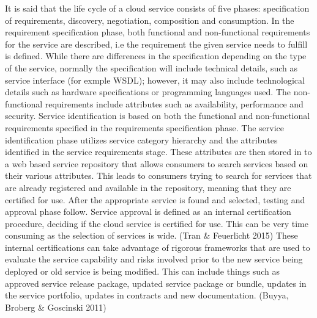\documentclass{article}
\begin{document}
It is said that the life cycle of a cloud service consists of five phases: specification of requirements, discovery, negotiation, composition and consumption. In the requirement specification phase, both functional and non-functional requirements for the service are described, i.e the requirement the given service needs to fulfill is defined. While there are differences in the specification depending on the type of the service, normally the specification will include technical details, such as service interface (for exmple WSDL); however, it may also include technological details such as hardware specifications or programming languages used. The non-functional requirements include attributes such as availability, performance and security. Service identification is based on both the functional and non-functional requirements specified in the requirements specification phase. The service identification phase utilizes service category hierarchy and the attributes identified in the service requirements stage. These attributes are then stored in to a web based service repository that allows consumers to search services based on their various attributes. This leads to consumers trying to search for services that are already registered and available in the repository, meaning that they are certified for use. After the appropriate service is found and selected, testing and approval phase follow. Service approval is defined as an internal certification procedure, deciding if the cloud service is certified for use. This can be very time consuming as the selection of services is wide. (Tran \& Feuerlicht 2015) These internal certifications can take advantage of rigorous frameworks that are used to evaluate the service capability and risks involved prior to the new service being deployed or old service is being modified. This can include things such as approved service release package, updated service package or bundle, updates in the service portfolio, updates in contracts and new documentation. (Buyya, Broberg \& Goscinski 2011) 
\par
\end{document}

